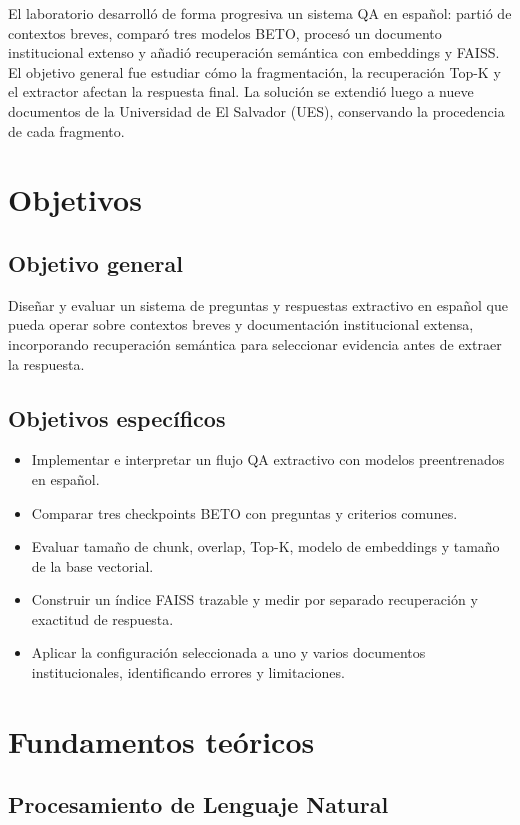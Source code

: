 \documentclass[12pt,letterpaper]{article}
\begin{document}
El laboratorio desarrolló de forma progresiva un sistema QA en español:
partió de contextos breves, comparó tres modelos BETO, procesó un documento
institucional extenso y añadió recuperación semántica con embeddings y FAISS.
El objetivo general fue estudiar cómo la fragmentación, la recuperación Top-K
y el extractor afectan la respuesta final. La solución se extendió luego a
nueve documentos de la Universidad de El Salvador (UES), conservando la
procedencia de cada fragmento.

\section{Objetivos}

\subsection{Objetivo general}

Diseñar y evaluar un sistema de preguntas y respuestas extractivo en español
que pueda operar sobre contextos breves y documentación institucional extensa,
incorporando recuperación semántica para seleccionar evidencia antes de
extraer la respuesta.

\subsection{Objetivos específicos}

\begin{itemize}
  \item Implementar e interpretar un flujo QA extractivo con modelos
  preentrenados en español.
  \item Comparar tres checkpoints BETO con preguntas y criterios comunes.
  \item Evaluar tamaño de chunk, overlap, Top-K, modelo de embeddings y tamaño
  de la base vectorial.
  \item Construir un índice FAISS trazable y medir por separado recuperación y
  exactitud de respuesta.
  \item Aplicar la configuración seleccionada a uno y varios documentos
  institucionales, identificando errores y limitaciones.
\end{itemize}

\section{Fundamentos teóricos}

\subsection{Procesamiento de Lenguaje Natural}
\end{document}
